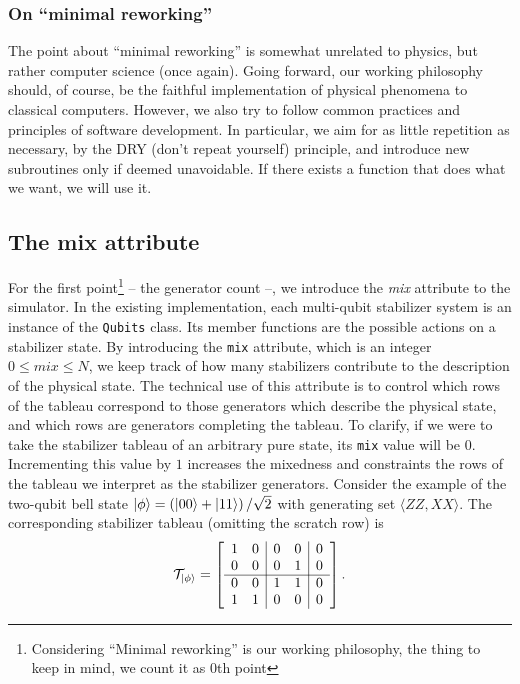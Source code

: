 \subsubsection{On \enquote{minimal reworking}}
The point about \enquote{minimal reworking} is somewhat unrelated to
physics, but rather computer science (once again). Going forward, our working
philosophy should, of course, be the faithful implementation of physical
phenomena to classical computers. However, we also try to follow common
practices and principles of software development. In particular, we aim for as
little repetition as necessary, by the DRY (don't repeat yourself) principle,
and introduce new subroutines only if deemed unavoidable. If there exists a
function that does what we want, we will use it.

\subsection{The mix attribute}
%
For the first point\footnote{Considering \enquote{Minimal reworking} is our
working philosophy, the thing to keep in mind, we count it as $0$th point}  --
the generator count --, we introduce the \emph{mix} attribute to the simulator.
In the existing implementation, each multi-qubit stabilizer system is an
instance of the \texttt{Qubits} class. Its member functions are the possible
actions on a stabilizer state. By introducing the \verb|mix| attribute, which
is an integer $0\leq mix \leq N$, we keep track of how many stabilizers
contribute to the description of the physical state. The technical use of this
attribute is to control which rows of the tableau correspond to those
generators which describe the physical state, and which rows are generators
completing the tableau. To clarify, if we were to take the stabilizer tableau
of an arbitrary pure state, its \verb|mix| value will be $0$. Incrementing this
value by $1$ increases the mixedness and constraints the rows of the tableau we
interpret as the stabilizer generators. Consider the example of the two-qubit
bell state $\ket{\phi} = \left( \ket{00} + \ket{11} \right) /\sqrt{2}$ with
generating set $\langle ZZ, XX\rangle$. The corresponding stabilizer tableau
(omitting the scratch row) is
\begin{align}
\mathcal{T}_{\ket{\phi}} = 
  \left[
    \begin{array}{cc|cc|c}
      1 & 0 & 0 & 0 & 0 \\
      0 & 0 & 0 & 1 & 0 \\ \hline
      0 & 0 & 1 & 1 & 0 \\
      1 & 1 & 0 & 0 & 0 \\ 
    \end{array}
  \right]
.\end{align}
